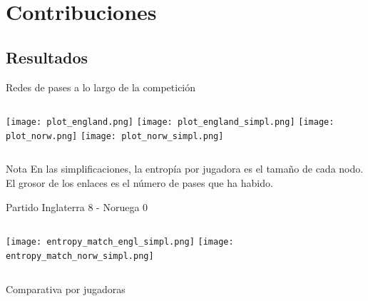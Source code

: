 \documentclass{beamer}
\begin{document}
\section{Contribuciones}

\subsection{Resultados}

\begin{frame}{Redes de pases a lo largo de la competición}
    \begin{columns}[t]
        \texttt{[image: plot\_england.png]}
        \texttt{[image: plot\_england\_simpl.png]}
        \texttt{[image: plot\_norw.png]}
        \texttt{[image: plot\_norw\_simpl.png]}
    \end{columns} 
	\begin{alertblock}{Nota}
		\textlatin{En las simplificaciones, la entropía por jugadora es el tamaño de cada nodo. El grosor de los enlaces es el 
	 	número de pases que ha habido.}
	\end{alertblock}
\end{frame}

\begin{frame}{Partido Inglaterra 8 - Noruega 0}
		\begin{columns}[t]
			\texttt{[image: entropy\_match\_engl\_simpl.png]}
			\texttt{[image: entropy\_match\_norw\_simpl.png]}
		\end{columns} 
	\end{frame}

\begin{frame}{Comparativa por jugadoras}
	\begin{figure}
		\centering
		\end{figure}
\end{frame}
\end{document}

